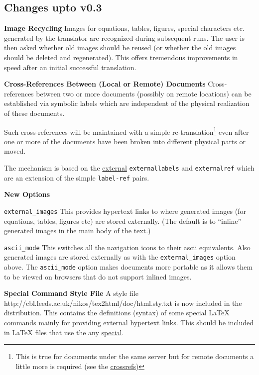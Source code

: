 \subsection{Changes upto v0.3}
\begin{htmllist}
\item [\textbf{Image Recycling}]
Images for equations, tables, figures, special characters etc. generated by
the translator are recognized  during subsequent runs.
The user is then asked whether old images should be reused
(or whether the old images should be deleted and regenerated).
This offers tremendous improvements in speed after an initial
successful translation.

\item [\textbf{Cross-References Between (Local or Remote) Documents}]
Cross-references between 
two or more documents (possibly on remote locations) can be
established via symbolic labels
which are independent of the physical realization of these documents. 

Such cross-references will be maintained with a simple
re-translation\footnote{This is true for documents under the same
server but for remote documents a little more is required (see 
the \hyperref{example}{example in Section}{}{crossrefs})}
even after one or more of the documents have been broken into
different physical parts or moved.

The mechanism is based on the 
\hyperref{new commands}{new commands (see Section }{ )}{external}
\texttt{externallabels} and \texttt{externalref} which are an extension of the simple 
\texttt{label-ref} pairs. 

\item [\textbf{New Options}] \hfill
\begin{htmllist}
\item [\texttt{external\_images}] This provides hypertext links to where
generated images (for equations, tables, figures etc) are stored
externally. (The default is to ``inline'' generated images in the main body 
of the text.)
\item [\texttt{ascii\_mode}] This switches all the navigation icons to their
ascii equivalents. Also generated images are stored externally as with the 
\texttt{external\_images} option above. The \texttt{ascii\_mode} option
makes documents more portable as it allows them to be
viewed on browsers that do not support inlined images.
\end{htmllist}
\item [\textbf{Special Command Style File}] A style file  
{http://cbl.leeds.ac.uk/nikos/tex2html/doc/html.sty.txt} is now included in the
distribution. This contains the definitions (syntax) of some 
special LaTeX commands mainly for providing external hypertext
links.
This should be included in LaTeX files that use the any 
\hyperref{hypermedia extensions}{hypermedia extensions (see Section}{ )}{special}.


\end{htmllist}
